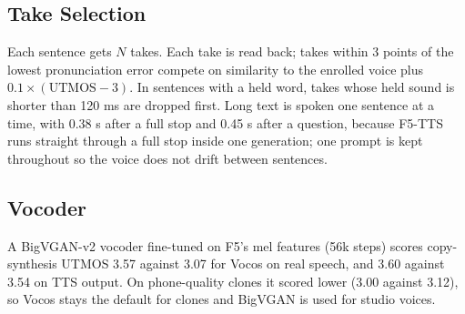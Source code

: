 \subsection{Take Selection}\label{sec:take}
Each sentence gets $N$ takes. Each take is read back; takes within 3 points of the lowest pronunciation error compete on similarity to the enrolled voice plus $0.1\times(\text{UTMOS}-3)$. In sentences with a held word, takes whose held sound is shorter than 120 ms are dropped first. Long text is spoken one sentence at a time, with 0.38 s after a full stop and 0.45 s after a question, because F5-TTS runs straight through a full stop inside one generation; one prompt is kept throughout so the voice does not drift between sentences.

\subsection{Vocoder}
A BigVGAN-v2 vocoder fine-tuned on F5's mel features (56k steps) scores copy-synthesis UTMOS 3.57 against 3.07 for Vocos on real speech, and 3.60 against 3.54 on TTS output. On phone-quality clones it scored lower (3.00 against 3.12), so Vocos stays the default for clones and BigVGAN is used for studio voices.
